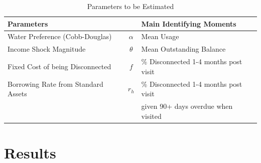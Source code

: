 \documentclass[12pt]{article}
\begin{document}
\begin{table}[H]
\centering
\caption{Parameters to be Estimated}\label{table:calibratedparam}
\vspace{-2mm}
\begin{tabular}{l*{1}{cl}}
\toprule
Parameters  &   & Main Identifying Moments  \\
\midrule
Water Preference (Cobb-Douglas) & $\alpha$ & Mean Usage \\[.1em]
Income Shock Magnitude & $\theta$ & Mean Outstanding Balance  \\[.1em]
Fixed Cost of being Disconnected  & $f$ &  \% Disconnected 1-4 months post visit \\[.1em]
Borrowing Rate from Standard Assets & $r_h$ & \% Disconnected 1-4 months post visit \\
 & & given 90+ days overdue when visited \\
\bottomrule
\end{tabular}
\end{table}








\section{Results}
\end{document}
